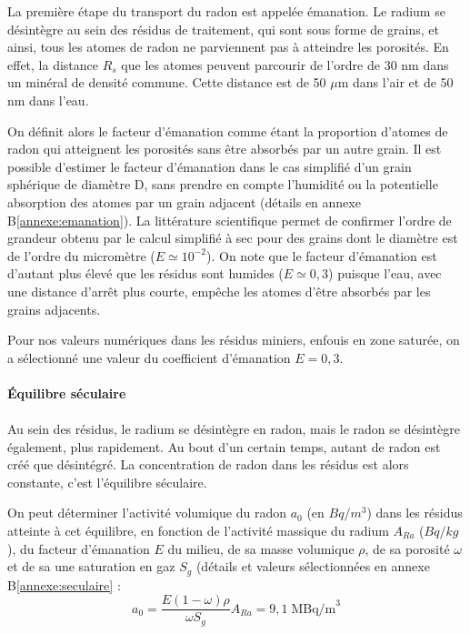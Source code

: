 \documentclass{article}
\begin{document}
La première étape du transport du radon est appelée émanation. Le radium se désintègre au sein des résidus de traitement, qui sont sous forme de grains, et ainsi, tous les atomes de radon ne parviennent pas à atteindre les porosités. En effet, la distance $R_s$ que les atomes peuvent parcourir de l’ordre de 30 nm dans un minéral de densité commune. Cette distance est de 50 $\mu$m dans l’air et de 50 nm dans l’eau.

On définit alors le facteur d’émanation comme étant la proportion d’atomes de radon qui atteignent les porosités sans être absorbés par un autre grain. Il est possible d’estimer le facteur d’émanation \cite{fleischer_theory_1983} dans le cas simplifié d’un grain sphérique de diamètre D, sans prendre en compte l’humidité ou la potentielle absorption des atomes par un grain adjacent (détails en annexe B\ref{annexe:emanation}). La littérature scientifique \cite{ferry_migration_2000} permet de confirmer l’ordre de grandeur obtenu par le calcul simplifié à sec pour des grains dont le diamètre est de l’ordre du micromètre ($E \simeq 10^{-2}$). On note que le facteur d’émanation est d’autant plus élevé que les résidus sont humides ($E\simeq 0,3$) puisque l’eau, avec une distance d’arrêt plus courte, empêche les atomes d’être absorbés par les grains adjacents.

Pour nos valeurs numériques dans les résidus miniers, enfouis en zone saturée, on a sélectionné une valeur du coefficient d’émanation $E=0,3$.

\paragraph{Équilibre séculaire}

\paragraph{} Au sein des résidus, le radium se désintègre en radon, mais le radon se désintègre également, plus rapidement. Au bout d’un certain temps, autant de radon est créé que désintégré. La concentration de radon dans les résidus est alors constante, c’est l’équilibre séculaire.

On peut déterminer l'activité volumique du radon $a_0$ (en $Bq/m^3$) dans les résidus atteinte à cet équilibre, en fonction de l'activité massique du radium $A_{Ra}$ ($Bq/kg$), du facteur d'émanation $E$ du milieu, de sa masse volumique $\rho$, de sa porosité $\omega$ et de sa une saturation en gaz $S_g$ (détails et valeurs sélectionnées en annexe B\ref{annexe:seculaire} :
$$
a_0 =\frac{E(1-\omega)\rho}{\omega S_g} A_{Ra} =9,1 \; \text{MBq/m}^3
$$
\end{document}
